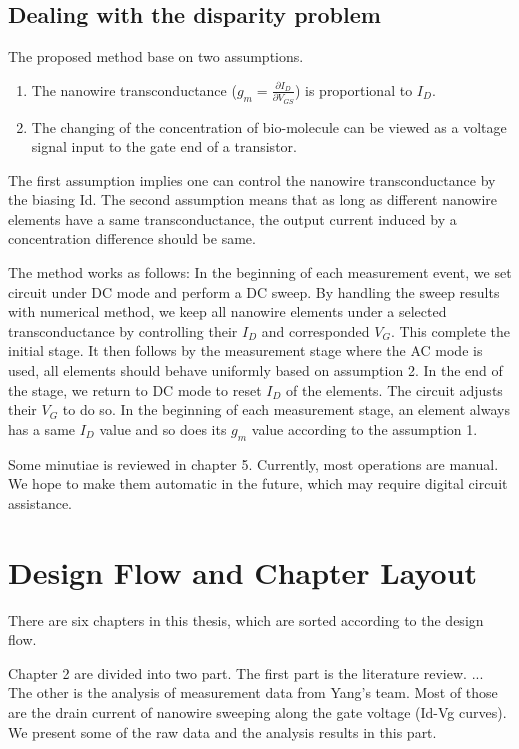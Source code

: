 \subsection*{Dealing with the disparity problem}
The proposed method base on two assumptions.
\begin{enumerate}
    \item The nanowire transconductance ($g_m = \frac{\partial I_D}{\partial V_{GS}}$) is proportional to $I_D$.
    \item The changing of the concentration of bio-molecule can be viewed as a voltage signal input to the gate end of a transistor.
\end{enumerate}
The first assumption implies one can control the nanowire transconductance by the biasing Id.
The second assumption means that as long as different nanowire elements have a same transconductance, the output current induced by a concentration difference should be same.

The method works as follows:
In the beginning of each measurement event, we set circuit under DC mode and perform a DC sweep.
By handling the sweep results with numerical method, we keep all nanowire elements under a selected transconductance by controlling their $I_D$ and corresponded $V_G$.
This complete the initial stage.
It then follows by the measurement stage where the AC mode is used, all elements should behave uniformly based on assumption 2.
In the end of the stage, we return to DC mode to reset $I_D$ of the elements.
The circuit adjusts their $V_G$ to do so.
In the beginning of each measurement stage, an element always has a same $I_D$ value and so does its $g_m$ value according to the assumption 1.


Some minutiae is reviewed in chapter 5.
Currently, most operations are manual.
We hope to make them automatic in the future, which may require digital circuit assistance.


\section{Design Flow and Chapter Layout}
There are six chapters in this thesis, which are sorted according to the design flow.

Chapter 2 are divided into two part.
The first part is the literature review. {\color{red}...} The other is the analysis of measurement data from Yang's team.
Most of those are the drain current of nanowire sweeping along the gate voltage (Id-Vg curves).
We present some of the raw data and the analysis results in this part.

